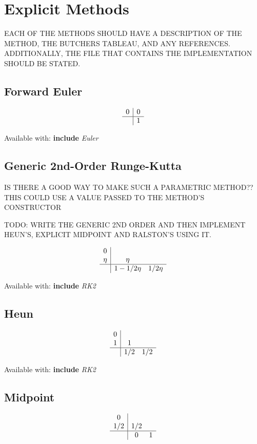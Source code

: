 \documentclass[letterpaper,10pt]{book}
\newcommand{\srcas}[1]{\textbf{include} \textlangle{}\textit{#1}\textrangle{}}
\begin{document}
      
    \section{Explicit Methods}
    
      EACH OF THE METHODS SHOULD HAVE A DESCRIPTION OF THE METHOD, THE BUTCHERS TABLEAU, AND ANY REFERENCES.  ADDITIONALLY, THE FILE THAT CONTAINS THE IMPLEMENTATION SHOULD BE STATED.
      
      \subsection{Forward Euler}   
	\[
	  \begin{array}{c|c}
	    0 & 0\\
	    \hline
	    & 1
	  \end{array}
	\]
	
	Available with: \srcas{Euler}
	
      \subsection{Generic 2nd-Order Runge-Kutta}
	IS THERE A GOOD WAY TO MAKE SUCH A PARAMETRIC METHOD?? THIS COULD USE A VALUE PASSED TO THE METHOD'S CONSTRUCTOR
	
	TODO: WRITE THE GENERIC 2ND ORDER AND THEN IMPLEMENT HEUN'S, EXPLICIT MIDPOINT AND RALSTON'S USING IT.
	
	\[
	  \begin{array}{c|cc}
	    0 & & \\
	    \eta & \eta & \\
	    \hline
	    & 1-1/2\eta & 1/2\eta
	  \end{array}
	\]

	Available with: \srcas{RK2}
	    
      \subsection{Heun}
	\[
	  \begin{array}{c|cc}
	    0 & & \\
	    1 & 1 & \\
	    \hline
	    & 1/2 & 1/2
	  \end{array}
	\]

	Available with: \srcas{RK2}
	
      \subsection{Midpoint}
	\[
	  \begin{array}{c|cc}
	    0 & & \\
	    1/2 & 1/2 & \\
	    \hline
	    & 0 & 1
	  \end{array}
	\]    
\end{document}
